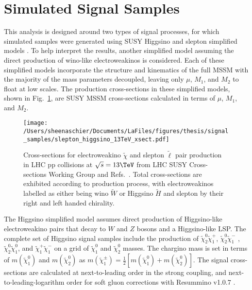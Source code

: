 \section{Simulated Signal Samples}
\label{sec:sig}
This analysis is designed around two types of signal processes, for which simulated samples were generated using SUSY Higgsino and slepton simplified models \cite{wacker, toro, alves}.  To help interpret the results, another simplified model assuming the direct production of wino-like electroweakinos is considered.  Each of these simplified models incorporate the structure and kinematics of the full MSSM with the majority of the mass parameters decoupled, leaving only $\mu$, $M_1$, and $M_2$ to float at low scales.  The production cross-sections in these simplified models, shown in Fig.~\ref{fig:xsec}, are SUSY MSSM cross-sections calculated in terms of $\mu$, $M_1$, and $M_2$. 
  \begin{figure}[tbp]
   \texttt{[image: /Users/sheenaschier/Documents/LaFiles/figures/thesis/signal\_samples/slepton\_higgsino\_13TeV\_xsect.pdf]}
   \caption{Cross-sections for electroweakino $\tilde\chi$ and slepton $\tilde\ell$ pair production in LHC pp collisions at $\sqrt{s}=13\TeV$ from LHC SUSY Cross-sections Working Group and Refs.~\cite{fuks, klasen}.  Total cross-sections are exhibited according to production process, with electroweakinos labelled as either being wino $\tilde W$ or Higgsino $\tilde H$ and slepton by their right and left handed chirality.}
   \label{fig:xsec}
  \end{figure}

The Higgsino simplified model assumes direct production of Higgsino-like electroweakino pairs that decay to $W$ and $Z$ bosons and a Higgsino-like LSP.  The complete set of Higgsino signal samples include the production of $\tilde\chi_2^0\tilde\chi_1^+$, $\tilde\chi_2^0\tilde\chi_1^-$ , $\tilde\chi_2^0\tilde\chi_1^0$, and $\tilde\chi_1^+\tilde\chi_1^-$ on a grid of $\tilde\chi_1^0$ and $\tilde\chi_2^0$ masses.  The chargino mass is set in terms of $m(\tilde\chi_1^0)$ and $m(\tilde\chi_2^0)$ as $m(\tilde\chi_1^\pm)=\frac{1}{2}[m(\tilde\chi_1^0)+m(\tilde\chi_2^0)]$.  The signal cross-sections are calculated at next-to-leading order in the strong coupling, and next-to-leading-logarithm order for soft gluon corrections with Resummino v1.0.7 \cite{fuks}.

